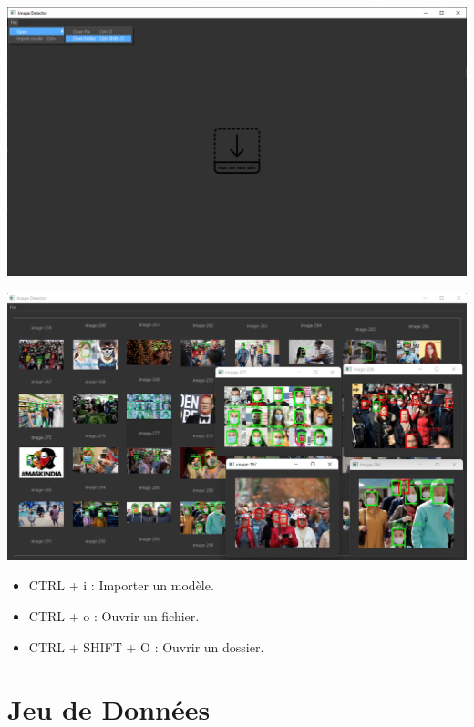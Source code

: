 \begin{center}
    \includegraphics[scale=0.4]{resources/software_import_folder.png}
\end{center}

\begin{center}
    \includegraphics[scale=0.4]{resources/software_predict_folder.png}
\end{center}
\begin{itemize}
    \item CTRL + i : Importer un modèle.
    \item CTRL + o : Ouvrir un fichier.
    \item CTRL + SHIFT + O : Ouvrir un dossier.
\end{itemize}


\section{Jeu de Données}

